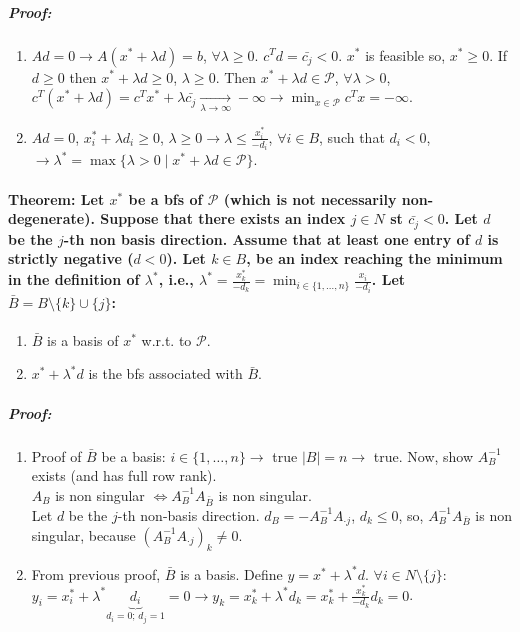 \documentclass[main]{subfiles}
\begin{document}
\subparagraph{Proof:}
\begin{enumerate}
\item $Ad =0 \rightarrow A(x^* + \lambda d) = b$, $\forall \lambda \geq 0$.
$c^T d = \bar{c_j} < 0$. $x^*$ is feasible so, $x^* \geq 0$. If $d \geq 0$
then $x^* + \lambda d \geq 0$, $\lambda \geq 0$. Then $x^* + \lambda d \in
\mathcal{P}$, $\forall \lambda > 0$, $c^T(x^* + \lambda d) = c^T x^* +
\lambda \bar{c_j} \xrightarrow[\lambda \to \infty]{} -\infty \rightarrow
\displaystyle \min_{x \in \mathcal{P}} c^{T} x = -\infty$.
\item $Ad = 0$, $x^*_i + \lambda d_i \geq 0$, $\lambda \geq 0 \rightarrow
\lambda \leq \frac{x^*_i}{-d_i}$, $\forall i \in B$, such that $d_i < 0$,
$\rightarrow \lambda^* = \max \{ \lambda > 0 \mid x^* + \lambda d
\in \mathcal{P} \}$.
\end{enumerate}

\paragraph{Theorem: Let $x^*$ be a bfs of $\mathcal{P}$ (which is not
necessarily non-degenerate). Suppose that there exists an index $j \in N$ st
$\bar{c_j} < 0$. Let $d$ be the $j$-th non basis direction. Assume that at
least one entry of $d$ is strictly negative ($d < 0$). Let $k \in B$, be an
index reaching the minimum in the definition of $\lambda^*$, i.e.,
$\lambda^* = \frac{x^*_k}{-d_k} = \displaystyle \min_{i \in \{1, \dots, n\}}
\frac{x_i}{-d_i}$. Let $\bar{B} = B\setminus \{ k\} \cup \{j\}$:}
\begin{enumerate}
\item $\bar{B}$ is a basis of $x^*$ w.r.t. to $\mathcal{P}$.
\item $x^* + \lambda^* d $ is the bfs associated with $\bar{B}$.
\end{enumerate}

\subparagraph{Proof:}

\begin{enumerate}
\item Proof of $\bar{B}$ be a basis:
\subitem $i \in \{1, \dots, n\} \rightarrow$ true
\subitem $|B| = n \rightarrow$ true.
\subitem Now, show $A^{-1}_B$ exists (and has full row rank).\\
$A_B$ is non singular $\iff A^{-1}_B A_{\bar{B}}$ is non singular.\\
Let $d$ be the $j$-th non-basis direction. $d_B = -A^{-1}_B A_{\cdot j}$,
$d_k \leq 0$, so, $A^{-1}_B A_{\bar{B}}$ is non singular, because
$(A^{-1}_B A_{\cdot j})_k \neq 0$.\\
\item From previous proof, $\bar{B}$ is a basis.
Define $y = x^* + \lambda^* d$. $\forall i \in N \setminus \{j\}$:
$y_i = x^*_i + \lambda^* \underbrace{d_i}_{d_i = 0 \text{; } d_j = 1} = 0
\rightarrow y_k = x^*_k + \lambda^* d_k = x^*_k + \frac{x^*_k}{-d_k} d_k = 0$.
\end{enumerate}
\end{document}
